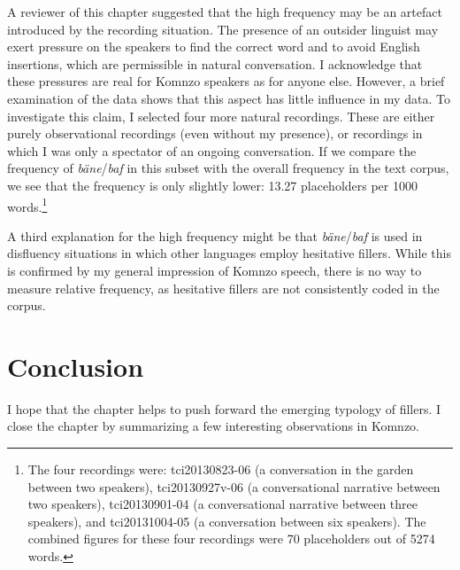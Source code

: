 \documentclass[output=paper,colorlinks,citecolor=brown]{langscibook}
\begin{document}
A reviewer of this chapter suggested that the high frequency may be an artefact introduced by the recording situation. The presence of an outsider linguist may exert pressure on the speakers to find the correct word and to avoid English insertions, which are permissible in natural conversation. I acknowledge that these pressures are real for Komnzo speakers as for anyone else. However, a brief examination of the data shows that this aspect has little influence in my data. To investigate this claim, I selected four more natural recordings. These are either purely observational recordings (even without my presence), or recordings in which I was only a spectator of an ongoing conversation. If we compare the frequency of \textit{bäne}/\textit{baf} in this subset with the overall frequency in the text corpus, we see that the frequency is only slightly lower: 13.27 placeholders per 1000 words.\footnote{The four recordings were: tci20130823-06 (a conversation in the garden between two speakers), tci20130927v-06 (a conversational narrative between two speakers), tci20130901-04 (a conversational narrative between three speakers), and tci20131004-05 (a conversation between six speakers). The combined figures for these four recordings were 70 placeholders out of 5274 words.}

A third explanation for the high frequency might be that \textit{bäne}/\textit{baf} is used in disfluency situations in which other languages employ hesitative fillers. While this is confirmed by my general impression of Komnzo speech, there is no way to measure relative frequency, as hesitative fillers are not consistently coded in the corpus.    

\section{Conclusion}\label{sec:doehler:concl}

I hope that the chapter helps to push forward the emerging typology of fillers. I close the chapter by summarizing a few interesting observations in Komnzo.
\end{document}
